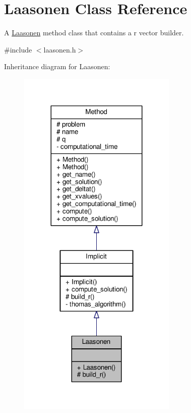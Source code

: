 \hypertarget{classLaasonen}{}\section{Laasonen Class Reference}
\label{classLaasonen}


A \hyperlink{classLaasonen}{Laasonen} method class that contains a r vector builder.  




{\ttfamily \#include $<$laasonen.\+h$>$}



Inheritance diagram for Laasonen\+:
\nopagebreak
\begin{figure}[H]
\begin{center}
\leavevmode
\includegraphics[width=215pt]{classLaasonen__inherit__graph}
\end{center}
\end{figure}


